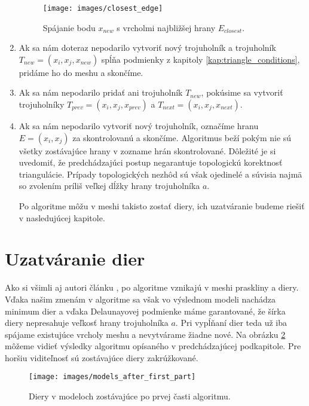 \begin{enumerate}
{        \begin{figure}
            \centerline{\texttt{[image: images/closest\_edge]}}
            \caption[Spájanie nového bodu s vrcholmi najbližšej hrany]
            {Spájanie bodu $x_{new}$ s vrcholmi najbližšej hrany $E_{closest}$.}
            \label{obr:closest_edge}
        \end{figure}
    }
    \item{
        Ak sa nám doteraz nepodarilo vytvoriť nový trojuholník a trojuholník $T_{new} = (x_i, x_j, x_{new})$
        spĺňa podmienky z kapitoly \ref{kap:triangle_conditions}, pridáme ho do meshu a skončíme.
    }
    \item{
        Ak sa nám nepodarilo pridať ani trojuholník $T_{new}$, pokúsime sa vytvoriť trojuholníky 
        $T_{prev} = (x_i, x_j, x_{prev})$ a $T_{next} = (x_i, x_j, x_{next})$.
    }
    \item{
        Ak sa nám nepodarilo vytvoriť nový trojuholník, označíme hranu $E = (x_i, x_j)$ za skontrolovanú
        a skončíme.
    }
    Algoritmus beží pokým nie sú všetky zostávajúce hrany v zozname hrán skontrolované. 
    Dôležité je si uvedomiť, že predchádzajúci postup negarantuje topologickú korektnosť
    triangulácie. Prípady topologických nezhôd sú však ojedinelé a súvisia najmä so zvolením príliš
    veľkej dĺžky hrany trojuholníka $a$.

    Po algoritme môžu v meshi takisto zostať diery, ich uzatváranie budeme riešiť v nasledujúcej kapitole.
\end{enumerate}

\section{Uzatváranie dier}
\label{kap:second_part_of_algorithm}
Ako si všimli aj autori článku \cite{akkouche2001adaptive}, po algoritme vznikajú v meshi 
praskliny a diery. Vďaka našim zmenám v algoritme sa však vo výslednom modeli nachádza minimum dier 
a vďaka Delaunayovej podmienke máme garantované, že šírka diery nepresahuje veľkosť hrany trojuholníka
$a$. Pri vypĺňaní dier teda už iba spájame existujúce vrcholy meshu a nevytvárame žiadne nové.
Na obrázku \ref{obr:models_after_first_part} môžeme vidieť výsledky algoritmu opísaného v 
predchádzajúcej podkapitole. Pre horšiu viditeľnosť sú zostávajúce diery zakrúžkované.

\begin{figure}
    \centerline{\texttt{[image: images/models\_after\_first\_part]}}
    \caption[Diery v modeloch]
    {Diery v modeloch zostávajúce po prvej časti algoritmu.}
    \label{obr:models_after_first_part}
\end{figure}

